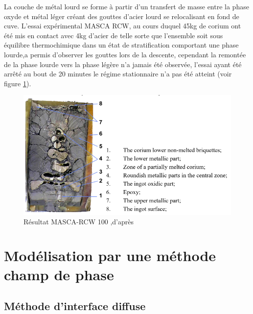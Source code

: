 \documentclass[a4paper,11pt,fleqn]{report}    %
\begin{document}
 

La couche de métal lourd se forme à partir d'un transfert de masse entre la phase oxyde et métal léger créant des gouttes d'acier lourd se relocalisant en fond de cuve. L'essai expérimental MASCA RCW, au cours duquel 45kg de corium ont été mis en contact avec 4kg d'acier de telle sorte que l'ensemble soit sous équilibre thermochimique dans un état de stratification comportant une phase lourde,a permis d'observer les gouttes lors de la descente, cependant la remontée de la phase lourde vers la phase légère n'a jamais été observée, l'essai ayant été arrêté au bout de 20 minutes le régime stationnaire n'a pas été atteint (voir figure \ref{fig:masca}).
 \begin{figure}[th!]
	\centering
	\includegraphics[width=0.7\linewidth]{figure/masca}
	\caption[Résultat MASCA-RCW 100]{Résultat MASCA-RCW 100 ,d'après \cite{}}
	\label{fig:masca}
\end{figure}


\chapter{Modélisation par une méthode champ de phase}
\section{Méthode d'interface diffuse}
\end{document}
